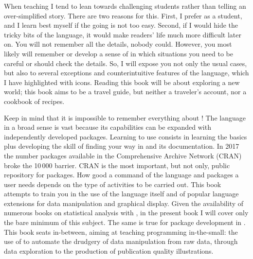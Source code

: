 When teaching I tend to lean towards challenging students rather than telling an over-simplified story. There are two reasons for this. First, I prefer as a student, and I learn best myself if the going is not too easy. Second, if I would hide the tricky bits of the \Rlang language, it would make readers' life much more difficult later on. You will not remember all the details, nobody could. However, you most likely will remember or develop a sense of in which situations you need to be careful or should check the details. So, I will expose you not only the usual cases, but also to several exceptions and counterintuitive features of the language, which I have highlighted with icons. Reading this book will be about exploring a new world; this book aims to be a travel guide, but neither a traveler's account, nor a cookbook of \Rlang recipes.

Keep in mind that it is impossible to remember everything about \Rlang! The \Rlang language in a broad sense is vast because its capabilities can be expanded with independently developed packages. Learning to use \Rlang consists in learning the basics plus developing the skill of finding your way in \Rlang and its documentation.  In 2017 the number packages available in the Comprehensive \Rlang Archive Network (CRAN) broke the 10\,000 barrier. CRAN is the most important, but not only, public repository for \Rlang packages. How good a command of the \Rlang language and packages a user needs depends on the type of activities to be carried out. This book attempts to train you in the use of the \Rlang language itself and of popular \Rlang language extensions for data manipulation and graphical display. Given the availability of numerous books on statistical analysis with \Rlang, in the present book I will cover only the bare minimum of this subject. The same is true for package development in \Rlang. This book seats in-between, aiming at teaching programming in-the-small: the use of \Rlang to automate the drudgery of data manipulation from raw data, through data exploration to the production of publication quality illustrations.

